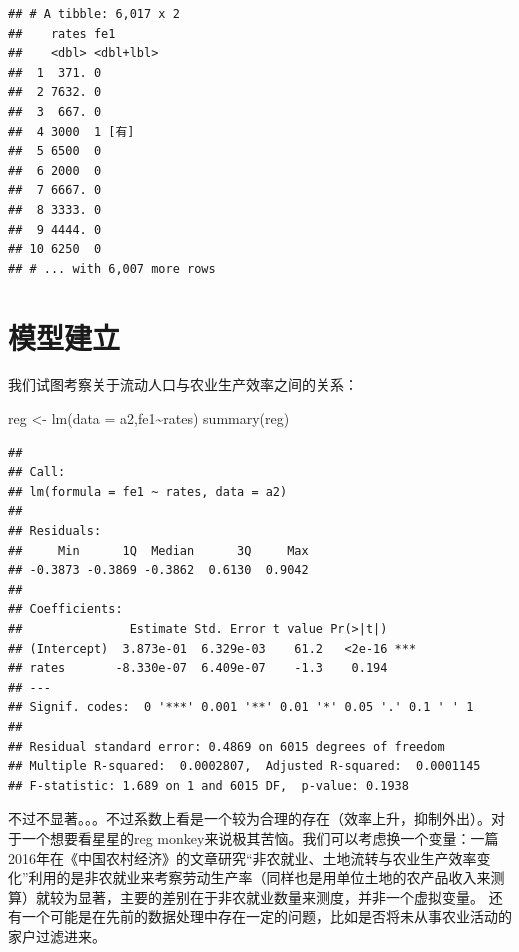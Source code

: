 \documentclass[
  oneside]{book}
\newenvironment{Shaded}{\begin{snugshade}}{\end{snugshade}}
\newcommand{\AttributeTok}[1]{\textcolor[rgb]{0.77,0.63,0.00}{#1}}
\newcommand{\FunctionTok}[1]{\textcolor[rgb]{0.00,0.00,0.00}{#1}}
\newcommand{\NormalTok}[1]{#1}
\newcommand{\OtherTok}[1]{\textcolor[rgb]{0.56,0.35,0.01}{#1}}
\newcommand{\SpecialCharTok}[1]{\textcolor[rgb]{0.00,0.00,0.00}{#1}}
\begin{document}
\begin{verbatim}
## # A tibble: 6,017 x 2
##    rates fe1      
##    <dbl> <dbl+lbl>
##  1  371. 0        
##  2 7632. 0        
##  3  667. 0        
##  4 3000  1 [有]   
##  5 6500  0        
##  6 2000  0        
##  7 6667. 0        
##  8 3333. 0        
##  9 4444. 0        
## 10 6250  0        
## # ... with 6,007 more rows
\end{verbatim}

\hypertarget{ux6a21ux578bux5efaux7acb}{%
\section{模型建立}\label{ux6a21ux578bux5efaux7acb}}

我们试图考察关于流动人口与农业生产效率之间的关系：

\begin{Shaded}
\begin{Highlighting}[]
\NormalTok{reg }\OtherTok{\textless{}{-}} \FunctionTok{lm}\NormalTok{(}\AttributeTok{data =}\NormalTok{ a2,fe1}\SpecialCharTok{\textasciitilde{}}\NormalTok{rates)}
\FunctionTok{summary}\NormalTok{(reg)}
\end{Highlighting}
\end{Shaded}

\begin{verbatim}
## 
## Call:
## lm(formula = fe1 ~ rates, data = a2)
## 
## Residuals:
##     Min      1Q  Median      3Q     Max 
## -0.3873 -0.3869 -0.3862  0.6130  0.9042 
## 
## Coefficients:
##               Estimate Std. Error t value Pr(>|t|)    
## (Intercept)  3.873e-01  6.329e-03    61.2   <2e-16 ***
## rates       -8.330e-07  6.409e-07    -1.3    0.194    
## ---
## Signif. codes:  0 '***' 0.001 '**' 0.01 '*' 0.05 '.' 0.1 ' ' 1
## 
## Residual standard error: 0.4869 on 6015 degrees of freedom
## Multiple R-squared:  0.0002807,  Adjusted R-squared:  0.0001145 
## F-statistic: 1.689 on 1 and 6015 DF,  p-value: 0.1938
\end{verbatim}

不过不显著。。。不过系数上看是一个较为合理的存在（效率上升，抑制外出）。对于一个想要看星星的reg monkey来说极其苦恼。我们可以考虑换一个变量：一篇2016年在《中国农村经济》的文章研究``非农就业、土地流转与农业生产效率变化''利用的是非农就业来考察劳动生产率（同样也是用单位土地的农产品收入来测算）就较为显著，主要的差别在于非农就业数量来测度，并非一个虚拟变量。
还有一个可能是在先前的数据处理中存在一定的问题，比如是否将未从事农业活动的家户过滤进来。
\end{document}
